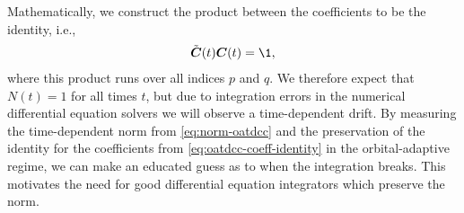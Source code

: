         Mathematically, we construct the product between the coefficients to
        be the identity, i.e.,
        \begin{align}
            \tilde{\vfg{C}}(t)\vfg{C}(t)
            = \1,
            \label{eq:oatdcc-coeff-identity}
        \end{align}
        where this product runs over all indices $p$ and $q$.
        We therefore expect that $N(t) = 1$ for all times $t$, but due to
        integration errors in the numerical differential equation solvers we
        will observe a time-dependent drift.
        By measuring the time-dependent norm from \autoref{eq:norm-oatdcc}
        and the preservation of the identity for the coefficients from
        \autoref{eq:oatdcc-coeff-identity} in the orbital-adaptive regime,
        we can make an educated guess as to when the integration breaks.
        This motivates the need for good differential equation integrators
        which preserve the norm.

